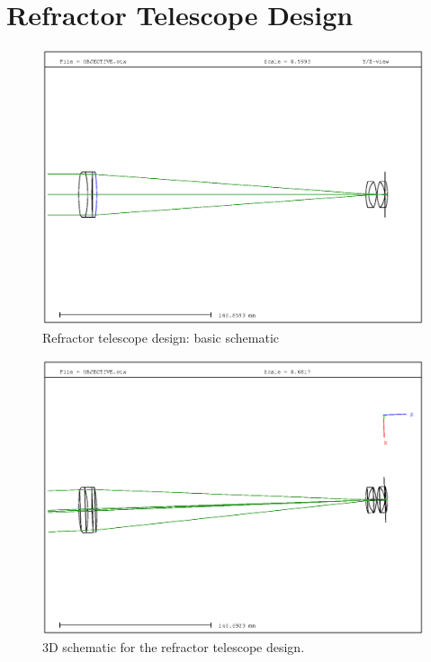 \chapter{Refractor Telescope Design}
\label{ap:telescope_design}

\begin{figure}[htpb]
    \centering
    \includegraphics[width=\linewidth]{img/eps/objective_basic.eps}
    \caption{Refractor telescope design: basic schematic}%
    \label{fig:basic_refractor}
\end{figure}

\begin{figure}[htpb]
    \centering
    \includegraphics[width=\linewidth]{img/eps/objective.eps}
    \caption{3D schematic for the refractor telescope design.}%
    \label{fig:3d_refractor}
\end{figure}

